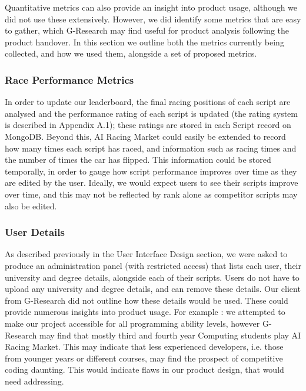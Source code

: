 Quantitative metrics can also provide an insight into product usage, although we did not use these extensively. However, we did identify some metrics that are easy to gather, which G-Research may find useful for product analysis following the product handover. In this section we outline both the metrics currently being collected, and how we used them, alongside a set of proposed metrics. 

\subsubsection{Race Performance Metrics}

In order to update our leaderboard, the final racing positions of each script are analysed and the performance rating of each script is updated (the rating system is described in Appendix A.1); these ratings are stored in each Script record on MongoDB. Beyond this, AI Racing Market could easily be extended to record how many times each script has raced, and information such as racing times and the number of times the car has flipped. This information could be stored temporally, in order to gauge how script performance improves over time as they are edited by the user. Ideally, we would expect users to see their scripts improve over time, and this may not be reflected by rank alone as competitor scripts may also be edited. 

\subsubsection{User Details}

As described previously in the User Interface Design section, we were asked to produce an administration panel (with restricted access) that lists each user, their university and degree details, alongside each of their scripts. Users do not have to upload any university and degree details, and can remove these details. Our client from G-Research did not outline how these details would be used. These could provide numerous insights into product usage. For example : we attempted to make our project accessible for all programming ability levels, however G-Research may find that mostly third and fourth year Computing students play AI Racing Market. This may indicate that less experienced developers, i.e. those from younger years or different courses, may find the prospect of competitive coding daunting. This would indicate flaws in our product design, that would need addressing.

